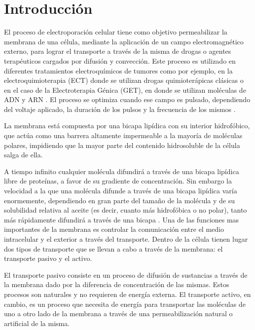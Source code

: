 \chapter{Introducción}

El proceso de electroporación celular tiene como objetivo permeabilizar la membrana de una célula, mediante la aplicación de un campo electromagnético externo, para lograr el transporte a través de la misma de drogas o agentes terapéuticos cargados por difusión y convección. Este proceso es utilizado en diferentes tratamientos electroquímicos de tumores \cite{c1, c2} como por ejemplo, en la electroquimioterapia (ECT) donde se utilizan drogas quimioterápicas clásicas o en el caso de la Electroterapia Génica (GET), en donde se utilizan moléculas de ADN y ARN \cite{c4-marino}. El proceso se optimiza cuando ese campo es pulsado, dependiendo del voltaje aplicado, la duración de los pulsos y la frecuencia de los mismos \cite{c3, c4-marino}.

La membrana está compuesta por una bicapa lipídica con su interior hidrofóbico, que actúa como una barrera altamente impermeable a la mayoría de moléculas polares, impidiendo que la mayor parte del contenido hidrosoluble de la célula salga de ella. 

A tiempo infinito  cualquier molécula difundirá a través de una bicapa lipídica libre de proteínas, a favor de su gradiente de concentración. Sin embargo la velocidad a la que una molécula difunde a través de una bicapa lipídica varía enormemente, dependiendo en gran parte del tamaño de la molécula y de su solubilidad relativa al aceite (es decir, cuanto más hidrofóbica o no polar), tanto más rápidamente difundirá a través de una bicapa \cite[p.~470-471]{c12}. Una de las funciones mas importantes de la membrana es controlar la comunicación entre el medio intracelular y el exterior a través del transporte. Dentro de la célula tienen lugar dos tipos de transporte que se llevan a cabo a través de la membrana: el transporte pasivo y el activo. 

El transporte pasivo consiste en un proceso de difusión de sustancias a través de la membrana dado por la diferencia de concentración de las mismas. Estos procesos son naturales y no requieren de energía externa. El transporte activo, en cambio, es un proceso que necesita de energía para transportar las moléculas de uno a otro lado de la membrana a través de una permeabilización natural o artificial de la misma.

